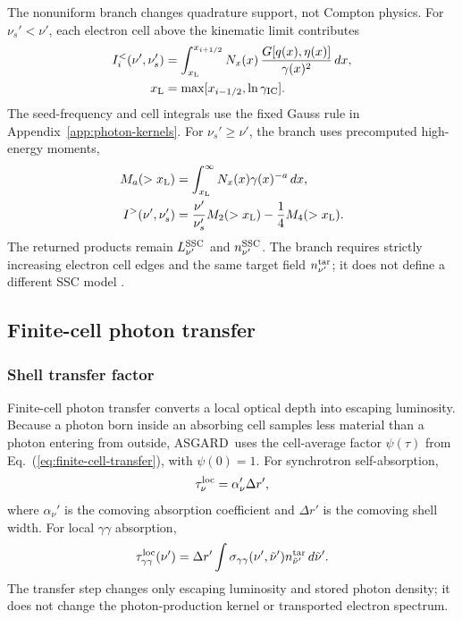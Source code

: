 \documentclass[twocolumn]{aastex702}
\newcommand{\asgard}{\textsc{ASGARD}}
\begin{document}
The nonuniform branch changes quadrature support, not Compton physics.  For
\(\nu_s'<\nu'\), each electron cell above the kinematic limit contributes
\begin{equation}
\begin{aligned}
I_i^{<}(\nu',\nu_s')
&=\int_{x_{\rm L}}^{x_{i+1/2}}
N_x(x)\,\frac{G[q(x),\eta(x)]}{\gamma(x)^2}\,dx,\\
x_{\rm L}&=\max[x_{i-1/2},\ln\gamma_{\rm IC}].
\end{aligned}
\end{equation}
The seed-frequency and cell integrals use the fixed Gauss rule in
Appendix~\ref{app:photon-kernels}.  For \(\nu_s'\ge\nu'\), the branch uses
precomputed high-energy moments,
\begin{equation}
\begin{aligned}
M_a(>x_{\rm L})&=\int_{x_{\rm L}}^\infty N_x(x)\gamma(x)^{-a}\,dx,\\
I^{>}(\nu',\nu_s')
&=\frac{\nu'}{\nu_s'}M_2(>x_{\rm L})-\frac{1}{4}M_4(>x_{\rm L}) .
\end{aligned}
\end{equation}
The returned products remain \(L_{\nu'}^{\rm SSC}\) and
\(n_{\nu'}^{\rm SSC}\).  The branch requires strictly increasing electron cell
edges and the same target field \(n_{\nu'}^{\rm tar}\); it does not define a
different SSC model \citep{Jones1968,BlumenthalGould1970}.

\subsection{Finite-cell photon transfer}

\subsubsection{Shell transfer factor}

Finite-cell photon transfer converts a local optical depth into escaping
luminosity.  Because a photon born inside an absorbing cell samples less material
than a photon entering from outside, \asgard\ uses the cell-average factor
\(\psi(\tau)\) from Eq.~(\ref{eq:finite-cell-transfer}), with \(\psi(0)=1\).  For
synchrotron self-absorption,
\[
\tau_\nu^{\rm loc}=\alpha_\nu'\Delta r',
\]
where \(\alpha_\nu'\) is the comoving absorption coefficient and \(\Delta r'\) is
the comoving shell width.  For local \(\gamma\gamma\) absorption,
\[
\tau_{\gamma\gamma}^{\rm loc}(\nu')
=\Delta r'\int \sigma_{\gamma\gamma}(\nu',\tilde\nu')
n_{\tilde\nu'}^{\rm tar}\,d\tilde\nu' .
\]
The transfer step changes only escaping luminosity and stored photon density; it
does not change the photon-production kernel or transported electron spectrum.
\end{document}
